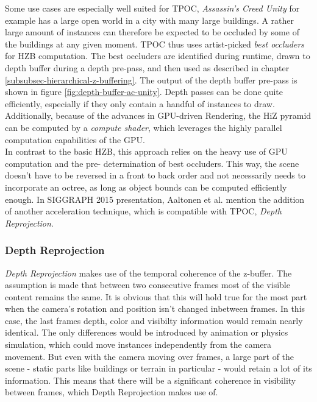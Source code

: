 \noindent
Some use cases are especially well suited for \ac{TPOC}, \emph{Assassin's Creed Unity} for example has a large open 
world in a city with many large buildings. A rather large amount of instances can therefore be expected to be occluded 
by some of the buildings at any given moment. \ac{TPOC} thus uses artist-picked \emph{best occluders} for \ac{HZB} 
computation. The best occluders are identified during runtime, drawn to depth buffer during a depth pre-pass, and 
then used as described in chapter \ref{subsubsec-hierarchical-z-buffering}. The output of the depth buffer pre-pass is 
shown in figure \ref{fig:depth-buffer-ac-unity}. Depth passes can be done quite efficiently, especially if they 
only contain a handful of instances to draw. Additionally, because of the advances in \ac{GPU}-driven Rendering, the 
\ac{HiZ} pyramid can be computed by a \emph{compute shader}, which leverages the highly parallel computation 
capabilities of the \ac{GPU}. \\

\noindent
In contrast to the basic \ac{HZB}, this approach relies on the heavy use of \ac{GPU} computation and the pre-
determination of best occluders. This way, the scene doesn't have to be reversed in a front to back order and 
not necessarily needs to incorporate an octree, as long as object bounds can be computed efficiently enough.
In SIGGRAPH 2015 presentation, Aaltonen et al. \cite{Aaltonen2015} mention the addition of another acceleration 
technique, which is compatible with \ac{TPOC}, \emph{Depth Reprojection}.


\subsubsection*{Depth Reprojection} \label{subsubsec-depth-reprojection}

\emph{Depth Reprojection} makes use of the temporal coherence of the z-buffer. The assumption is made that 
between two consecutive frames most of the visible content remains the same. It is obvious that this will 
hold true for the most part when the camera's rotation and position isn't changed inbetween frames. In this case, 
the last frames depth, color and visibilty information would remain nearly identical. The only differences would 
be introduced by animation or physics simulation, which could move instances independently from the camera movement.
But even with the camera moving over frames, a large part of the scene - static parts like buildings or terrain in 
particular - would retain a lot of its information. This means that there will be a significant coherence in 
visibility between frames, which Depth Reprojection makes use of.\\

